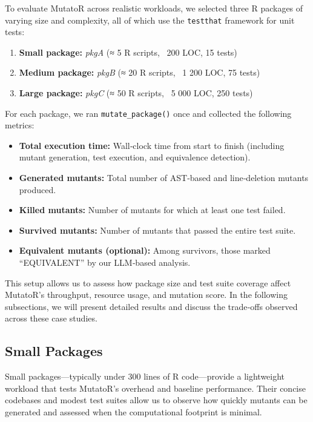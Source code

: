 To evaluate MutatoR across realistic workloads, we selected three R packages of varying size and complexity, all of which use the \texttt{testthat} framework for unit tests:

\begin{enumerate}
  \item \textbf{Small package:} \emph{pkgA} (≈ 5 R scripts, ~200 LOC, 15 tests)  
  \item \textbf{Medium package:} \emph{pkgB} (≈ 20 R scripts, ~1 200 LOC, 75 tests)  
  \item \textbf{Large package:} \emph{pkgC} (≈ 50 R scripts, ~5 000 LOC, 250 tests)  
\end{enumerate}

For each package, we ran \texttt{mutate\_package()} once and collected the following metrics:

\begin{itemize}
  \item \textbf{Total execution time:} Wall‐clock time from start to finish (including mutant generation, test execution, and equivalence detection).  
  \item \textbf{Generated mutants:} Total number of AST‐based and line‐deletion mutants produced.  
  \item \textbf{Killed mutants:} Number of mutants for which at least one test failed.  
  \item \textbf{Survived mutants:} Number of mutants that passed the entire test suite.  
  \item \textbf{Equivalent mutants (optional):} Among survivors, those marked “EQUIVALENT” by our LLM‐based analysis.
\end{itemize}

This setup allows us to assess how package size and test suite coverage affect MutatoR’s throughput, resource usage, and mutation score.  In the following subsections, we will present detailed results and discuss the trade‐offs observed across these case studies.

\subsection{Small Packages}

Small packages—typically under 300 lines of R code—provide a lightweight workload that tests MutatoR’s overhead and baseline performance. Their concise codebases and modest test suites allow us to observe how quickly mutants can be generated and assessed when the computational footprint is minimal.

